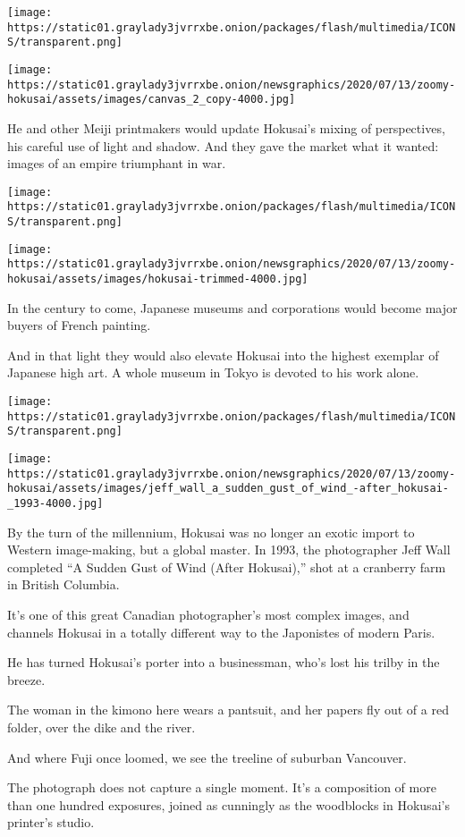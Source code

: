 \texttt{[image: https://static01.graylady3jvrrxbe.onion/packages/flash/multimedia/ICONS/transparent.png]}

\texttt{[image: https://static01.graylady3jvrrxbe.onion/newsgraphics/2020/07/13/zoomy-hokusai/assets/images/canvas\_2\_copy-4000.jpg]}

He and other Meiji printmakers would update Hokusai's mixing of
perspectives, his careful use of light and shadow. And they gave the
market what it wanted: images of an empire triumphant in war.

\texttt{[image: https://static01.graylady3jvrrxbe.onion/packages/flash/multimedia/ICONS/transparent.png]}

\texttt{[image: https://static01.graylady3jvrrxbe.onion/newsgraphics/2020/07/13/zoomy-hokusai/assets/images/hokusai-trimmed-4000.jpg]}

In the century to come, Japanese museums and corporations would become
major buyers of French painting.

And in that light they would also elevate Hokusai into the highest
exemplar of Japanese high art. A whole museum in Tokyo is devoted to his
work alone.

\texttt{[image: https://static01.graylady3jvrrxbe.onion/packages/flash/multimedia/ICONS/transparent.png]}

\texttt{[image: https://static01.graylady3jvrrxbe.onion/newsgraphics/2020/07/13/zoomy-hokusai/assets/images/jeff\_wall\_a\_sudden\_gust\_of\_wind\_-after\_hokusai-\_1993-4000.jpg]}

By the turn of the millennium, Hokusai was no longer an exotic import to
Western image-making, but a global master. In 1993, the photographer
Jeff Wall completed ``A Sudden Gust of Wind (After Hokusai),'' shot at a
cranberry farm in British Columbia.

It's one of this great Canadian photographer's most complex images, and
channels Hokusai in a totally different way to the Japonistes of modern
Paris.

He has turned Hokusai's porter into a businessman, who's lost his trilby
in the breeze.

The woman in the kimono here wears a pantsuit, and her papers fly out of
a red folder, over the dike and the river.

And where Fuji once loomed, we see the treeline of suburban Vancouver.

The photograph does not capture a single moment. It's a composition of
more than one hundred exposures, joined as cunningly as the woodblocks
in Hokusai's printer's studio.

